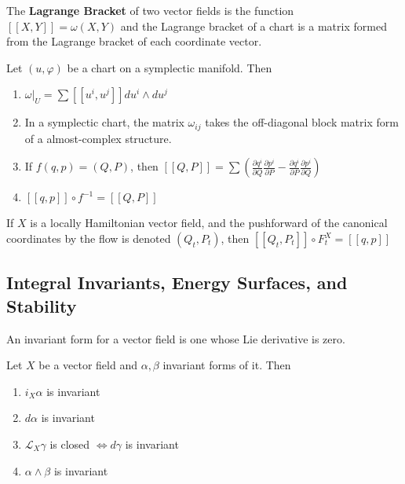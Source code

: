 \begin{defn}

The \textbf{Lagrange Bracket} of two vector fields is the function $ [[X,Y]] = \omega(X,Y) $ and the Lagrange bracket of a chart is a matrix formed from the Lagrange bracket of each coordinate vector.

\end{defn}

\begin{thm}

Let $(u, \varphi)$ be a chart on a symplectic manifold. Then

\begin{enumerate}
    \item $\omega \vert_U = \sum [[u^i, u^j]]du^i \wedge du^j$
    \item In a symplectic chart, the matrix $\omega_{ij}$ takes the off-diagonal block matrix form of a almost-complex structure.
    \item If $f(q,p) = (Q,P)$, then $[[Q,P]] = \sum \left( \frac{\partial q^i}{\partial Q} \frac{\partial p^i}{\partial P}   - \frac{\partial q^i}{\partial P} \frac{\partial p^i}{\partial Q} \right) $ 
    \item $ [[q,p]]\circ f^{-1} = [[Q, P]] $
\end{enumerate}

\end{thm}

\begin{thm}

If $X$ is a locally Hamiltonian vector field, and the pushforward of the canonical coordinates by the flow is denoted $(Q_t,P_t)$, then $[[Q_t,P_t]]\circ F^X_t = [[q,p]]$

\end{thm}

\subsection{Integral Invariants, Energy Surfaces, and Stability}

\begin{defn}

An invariant form for a vector field is one whose Lie derivative is zero.

\end{defn}

\begin{prop}

Let $X$ be a vector field and $\alpha, \beta$ invariant forms of it. Then 
\begin{enumerate}
    \item $i_X\alpha$ is invariant
    \item $d\alpha$ is invariant
    \item $\mathcal{L}_X \gamma$ is closed $\iff d\gamma$ is invariant
    \item $\alpha \wedge \beta$ is invariant
\end{enumerate}

\end{prop}

